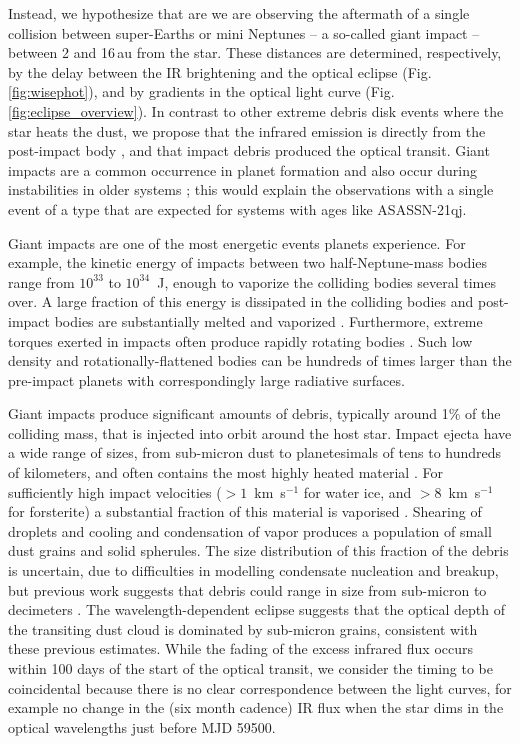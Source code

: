 \documentclass[sn-nature,oneside]{sn-jnl}%
\newcommand{\asas}{ASASSN-21qj}
\begin{document}
Instead, we hypothesize that are we are observing the aftermath of a single collision between super-Earths or mini Neptunes -- a so-called giant impact -- between 2 and 16\,au from the star. 
%
These distances are determined, respectively, by the delay between the IR brightening and the optical eclipse (Fig. \ref{fig:wisephot}), and by gradients in the optical light curve (Fig. \ref{fig:eclipse_overview}).
%
In contrast to other extreme debris disk events where the star heats the dust, we propose that the infrared emission is directly from the post-impact body \cite{Lock2017,2009ApJ...704..770M}, and that impact debris produced the optical transit.
%
Giant impacts are a common occurrence in planet formation \cite{Schlichting2018a,DAngelo2018} and also occur during instabilities in older systems \cite{Kaib2016}; this would explain the observations with a single event of a type that are expected for systems with ages like \asas{}.

Giant impacts are one of the most energetic events planets experience.
%
For example, the kinetic energy of impacts between two half-Neptune-mass bodies range from $10^{33}$ to $10^{34}$~J, enough to vaporize the colliding bodies several times over.
%
A large fraction of this energy is dissipated in the colliding bodies and post-impact bodies are substantially melted and vaporized \cite{Nakajima2015,Lock2017,Carter2020}.
%
Furthermore, extreme torques exerted in impacts often produce rapidly rotating bodies \cite{Lock2017}.
%
Such low density and rotationally-flattened bodies can be hundreds of times larger than the pre-impact planets \cite{Lock2017} with correspondingly large radiative surfaces.

Giant impacts produce significant amounts of debris, typically around 1\% of the colliding mass, that is injected into orbit around the host star\cite{Canup2001,Lock18}.
%
Impact ejecta have a wide range of sizes, from sub-micron dust to planetesimals of tens to hundreds of kilometers, and often contains the most highly heated material \cite{Benz2008_Mercury_book,Leinhardt2015,Carter2020a}.
%
For sufficiently high impact velocities ($>1$~km~s$^{-1}$ for water ice, and $>8$~km~s$^{-1}$ for forsterite) a substantial fraction of this material is vaporised \cite{Stewart2008,Davies2020,Carter2020a}.
%
Shearing of droplets and cooling and condensation of vapor produces a population of small dust grains and solid spherules.
%
The size distribution of this fraction of the debris is uncertain, due to difficulties in modelling condensate nucleation and breakup, but previous work suggests that debris could range in size from sub-micron to decimeters \cite{Benz2008_Mercury_book,Johnson2015}.
%
The wavelength-dependent eclipse suggests that the optical depth of the transiting dust cloud is dominated by sub-micron grains, consistent with these previous estimates.
%
While the fading of the excess infrared flux occurs within 100 days of the start of the optical transit, we consider the timing to be coincidental because there is no clear correspondence between the light curves, for example no  change in the (six month cadence) IR flux when the star dims in the optical wavelengths just before MJD 59500.
\end{document}
